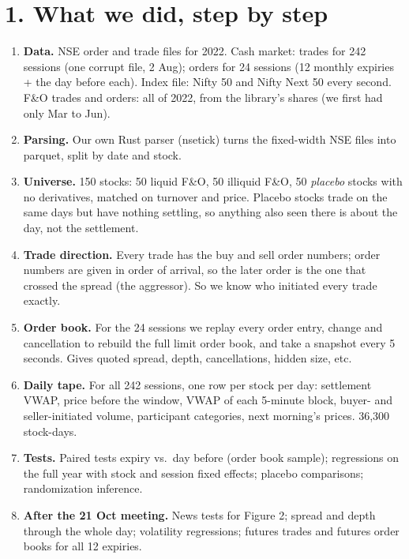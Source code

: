 \documentclass[11pt]{article}
\begin{document}
\section*{1. What we did, step by step}
\begin{enumerate}
  \item \textbf{Data.} NSE order and trade files for 2022. Cash market: trades for 242 sessions
  (one corrupt file, 2 Aug); orders for 24 sessions (12 monthly expiries + the day before each).
  Index file: Nifty 50 and Nifty Next 50 every second. F\&O trades and orders: all of 2022, from
  the library's shares (we first had only Mar to Jun).
  \item \textbf{Parsing.} Our own Rust parser (nsetick) turns the fixed-width NSE files into
  parquet, split by date and stock.
  \item \textbf{Universe.} 150 stocks: 50 liquid F\&O, 50 illiquid F\&O, 50 \emph{placebo} stocks
  with no derivatives, matched on turnover and price. Placebo stocks trade on the same days but
  have nothing settling, so anything also seen there is about the day, not the settlement.
  \item \textbf{Trade direction.} Every trade has the buy and sell order numbers; order numbers
  are given in order of arrival, so the later order is the one that crossed the spread (the
  aggressor). So we know who initiated every trade exactly.
  \item \textbf{Order book.} For the 24 sessions we replay every order entry, change and
  cancellation to rebuild the full limit order book, and take a snapshot every 5 seconds.
  Gives quoted spread, depth, cancellations, hidden size, etc.
  \item \textbf{Daily tape.} For all 242 sessions, one row per stock per day: settlement VWAP,
  price before the window, VWAP of each 5-minute block, buyer- and seller-initiated volume,
  participant categories, next morning's prices. 36,300 stock-days.
  \item \textbf{Tests.} Paired tests expiry vs.\ day before (order book sample); regressions on
  the full year with stock and session fixed effects; placebo comparisons; randomization
  inference.
  \item \textbf{After the 21 Oct meeting.} News tests for Figure 2; spread and depth through
  the whole day; volatility regressions; futures trades and futures order books for all 12
  expiries.
\end{enumerate}
\end{document}
